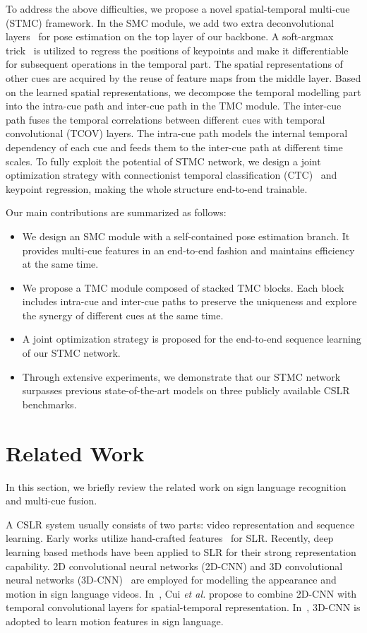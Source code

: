 \documentclass[letterpaper]{article} %
\begin{document}
To address the above difficulties, we propose a novel spatial-temporal multi-cue (STMC) framework.
In the SMC module, we add two extra deconvolutional layers~\cite{deconv,xiao2018simple} for pose estimation on the top layer of our backbone.
A soft-argmax trick~\cite{soft-argmax} is utilized to regress the positions of keypoints and make it differentiable for subsequent operations in the temporal part.
The spatial representations of other cues are acquired by the reuse of feature maps from the middle layer.
Based on the learned spatial representations, we decompose the temporal modelling part into the intra-cue path and inter-cue path in the TMC module.
The inter-cue path fuses the temporal correlations between different cues with temporal convolutional (TCOV) layers.
The intra-cue path models the internal temporal dependency of each cue and feeds them to the inter-cue path at different time scales.
To fully exploit the potential of STMC network, we design a joint optimization strategy with connectionist temporal classification (CTC)~\cite{CTC} and keypoint regression, making the whole structure end-to-end trainable.


Our main contributions are summarized as follows:
\begin{itemize}
\item We design an SMC module with a self-contained pose estimation branch. It provides multi-cue features in an end-to-end fashion and maintains efficiency at the same time.
\item We propose a TMC module composed of stacked TMC blocks. Each block includes intra-cue and inter-cue paths to preserve the uniqueness and explore the synergy of different cues at the same time.
\item A joint optimization strategy is proposed for the end-to-end sequence learning of our STMC network.
\item Through extensive experiments, we demonstrate that our STMC network surpasses previous state-of-the-art models on three publicly available CSLR benchmarks.
\end{itemize}


\section{Related Work}
In this section, we briefly review the related work on sign language recognition and multi-cue fusion.

A CSLR system usually consists of two parts: video representation and sequence learning. Early works utilize
hand-crafted features~\cite{cooper2009learning,buehler2009learning,yin2016iterative} for SLR.
Recently, deep learning based methods have been applied to SLR for their strong representation capability. 2D
convolutional neural networks (2D-CNN) and 3D convolutional neural networks (3D-CNN)~\cite{yukai3d,qiu2017learning-p3d} are employed for modelling the appearance and motion in sign language videos. In~\cite{staged}, Cui \textit{et al.} propose to combine 2D-CNN with temporal convolutional layers for spatial-temporal representation. In~\cite{molchanov2016online,dilated,zhou2019dynamic,wei2019bigmm}, 3D-CNN is adopted to learn motion features in sign language.
\end{document}
